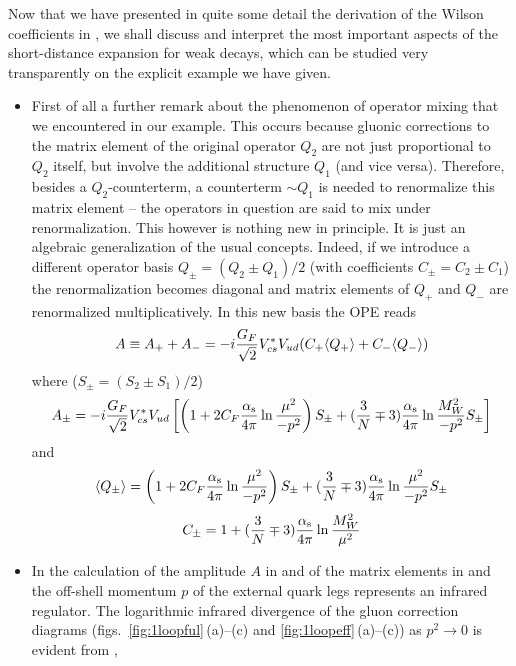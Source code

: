 Now that we have presented in quite some detail the derivation of
the Wilson coefficients in , we shall discuss and interpret
the most important aspects of the short-distance expansion for
weak decays, which can be studied very transparently on the explicit
example we have given.
\begin{itemize}
\item First of all a further remark about the phenomenon of
operator mixing that we encountered in our example. This occurs
because gluonic corrections to the matrix element of the original
operator $Q_2$ are not just proportional to $Q_2$ itself, but involve
the additional structure $Q_1$ (and vice versa). Therefore, besides
a $Q_2$-counterterm, a counterterm $\sim Q_1$ is needed to renormalize
this matrix element -- the operators in question are said to mix
under renormalization. This however is nothing new in principle. It
is just an algebraic generalization of the usual concepts. Indeed,
if we introduce a different operator basis $Q_\pm=(Q_2\pm Q_1)/2$
(with coefficients $C_\pm=C_2\pm C_1$) the renormalization becomes
diagonal and matrix elements of $Q_+$ and $Q_-$ are renormalized
multiplicatively. In this new basis the OPE reads
\begin{equation}\label{apam}  A\equiv A_++A_- =
-i{G_F\over\sqrt{2}}V^\ast_{cs}V_{ud}(C_+\langle Q_+\rangle +
C_-\langle Q_-\rangle)   \end{equation}
where ($S_\pm=(S_2\pm S_1)/2$)
\begin{equation}\label{aspm}
A_\pm=-i{G_F\over\sqrt{2}}V^\ast_{cs}V_{ud}\left[\left(1+2C_F \frac{\alpha_{\rm s}}{4 \pi}
\ln{\mu^2\over -p^2}\right)S_\pm+({3\over N}\mp 3)\frac{\alpha_{\rm s}}{4 \pi}\ln{M^2_W\over -p^2} S_\pm
\right]   \end{equation}
and
\begin{equation}\label{qmpm}
\langle Q_\pm\rangle=\left(1+2C_F \frac{\alpha_{\rm s}}{4 \pi}\ln{\mu^2\over -p^2}
\right)S_\pm+({3\over N}\mp 3)\frac{\alpha_{\rm s}}{4 \pi}\ln{\mu^2\over -p^2} S_\pm  \end{equation}
\begin{equation}\label{cpm}
C_\pm=1+({3\over N}\mp 3)\frac{\alpha_{\rm s}}{4 \pi} \ln{M^2_W\over\mu^2}   \end{equation}
\item In the calculation of the amplitude $A$ in  and of the
matrix elements in  and  the off-shell momentum $p$ of
the external quark legs represents an infrared regulator. The
logarithmic infrared divergence of the gluon correction diagrams
(figs.~\ref{fig:1loopful}\,(a)--(c) and \ref{fig:1loopeff}\,(a)--(c))
as $p^2\to 0$ is evident from , 

\end{itemize}
